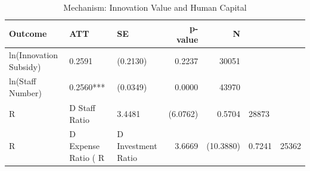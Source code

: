 \begin{table}
\caption{Mechanism: Innovation Value and Human Capital}
\label{tab:mechanism_innovation}
\begin{tabular}{lllrr}
\toprule
Outcome & ATT & SE & p-value & N \\
\midrule
ln(Innovation Subsidy) & 0.2591 & (0.2130) & 0.2237 & 30051 \\
ln(Staff Number) & 0.2560*** & (0.0349) & 0.0000 & 43970 \\
R&D Staff Ratio & 3.4481 & (6.0762) & 0.5704 & 28873 \\
R&D Expense Ratio (%
R&D Investment Ratio & 3.6669 & (10.3880) & 0.7241 & 25362 \\
\bottomrule
\end{tabular}
\end{table}
